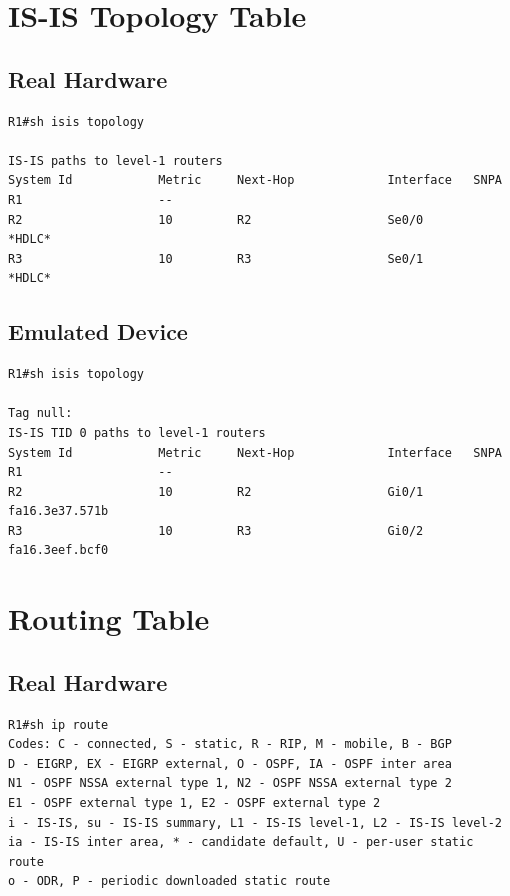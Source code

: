 \documentclass[11pt]{report}
\begin{document}
\begin{appendices}
\section{IS-IS Topology Table}

\subsection{Real Hardware}
\begin{lstlisting}
R1#sh isis topology

IS-IS paths to level-1 routers
System Id            Metric     Next-Hop             Interface   SNPA
R1                   --
R2                   10         R2                   Se0/0       *HDLC*
R3                   10         R3                   Se0/1       *HDLC*
\end{lstlisting}

\subsection{Emulated Device}
\begin{lstlisting}
R1#sh isis topology

Tag null:
IS-IS TID 0 paths to level-1 routers
System Id            Metric     Next-Hop             Interface   SNPA
R1                   --
R2                   10         R2                   Gi0/1       fa16.3e37.571b
R3                   10         R3                   Gi0/2       fa16.3eef.bcf0
\end{lstlisting}

\section{Routing Table}

\subsection{Real Hardware}

\begin{lstlisting}
R1#sh ip route
Codes: C - connected, S - static, R - RIP, M - mobile, B - BGP
D - EIGRP, EX - EIGRP external, O - OSPF, IA - OSPF inter area
N1 - OSPF NSSA external type 1, N2 - OSPF NSSA external type 2
E1 - OSPF external type 1, E2 - OSPF external type 2
i - IS-IS, su - IS-IS summary, L1 - IS-IS level-1, L2 - IS-IS level-2
ia - IS-IS inter area, * - candidate default, U - per-user static route
o - ODR, P - periodic downloaded static route


\end{lstlisting}
\end{appendices}
\end{document}

